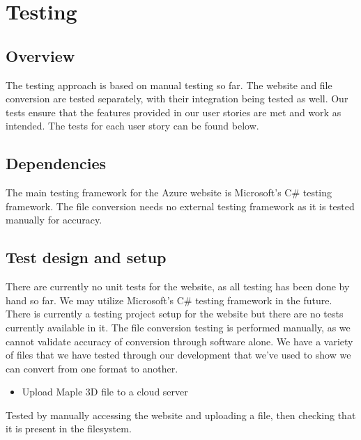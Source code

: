 

\chapter{Testing}
\label{ch:testing}


\section{Overview}
The testing approach is based on manual testing so far. 
The website and file conversion are tested separately, with their integration being tested as well.
Our tests ensure that the features provided in our user stories are met and work as intended.
The tests for each user story can be found below.

\section{Dependencies}
The main testing framework for the Azure website is Microsoft's C\# testing framework. 
The file conversion needs no external testing framework as it is tested manually for accuracy.

\section{Test design and setup}
There are currently no unit tests for the website, as all testing has been done by hand so far.
We may utilize Microsoft's C\# testing framework in the future. There is currently a testing project setup for the website but there are no tests currently available in it.
The file conversion testing is performed manually, as we cannot validate accuracy of conversion through software alone. We have a variety of files that we have tested through our development that we've used to show we can convert from one format to another.

\begin{itemize} \item Upload Maple 3D file to a cloud server \end{itemize}
\hspace{7mm}    
    Tested by manually accessing the website and uploading a file, then checking that it is present in the filesystem.

